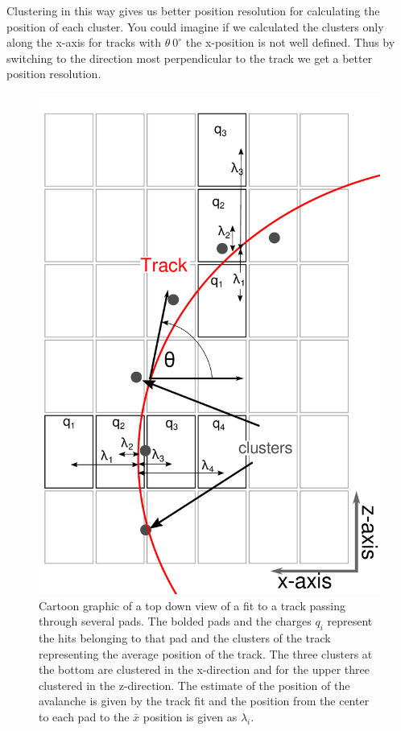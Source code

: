 \documentclass[review]{elsarticle}
\begin{document}
Clustering in this way gives us better position resolution for calculating the position of each cluster. You could imagine if we calculated the clusters only along the x-axis for tracks with $\theta ~ 0^{\circ}$ the x-position is not well defined. Thus by switching to the direction most perpendicular to the track we get a better position resolution.

\begin{figure}[H]
\includegraphics[scale=.5]{top_view_helix_ext.pdf}
\caption{Cartoon graphic of a top down view of a fit to a track passing through several pads. The bolded pads and the charges $q_i$ represent the hits belonging to that pad and the clusters of the track representing the average position of the track. The three clusters at the bottom are clustered in the x-direction and for the upper three clustered in the z-direction. The estimate of the position of the avalanche is given by the track fit and the position from the center to each pad to the $\bar{x}$ position is given as $\lambda_i$.}
\label{fig:topview}
\end{figure}
\end{document}
